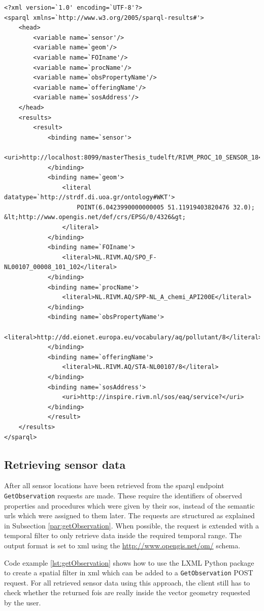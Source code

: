 \begin{lstlisting}[float,caption={Example SPARQL result of the query in Code example \ref{lst:getSensors}}, label={lst:getSensorsResponse}]
<?xml version=`1.0' encoding=`UTF-8'?>
<sparql xmlns=`http://www.w3.org/2005/sparql-results#'>
	<head>
		<variable name=`sensor'/>
		<variable name=`geom'/>
		<variable name=`FOIname'/>
		<variable name=`procName'/>
		<variable name=`obsPropertyName'/>
		<variable name=`offeringName'/>
		<variable name=`sosAddress'/>
	</head>
	<results>
		<result>
			<binding name=`sensor'>
				<uri>http://localhost:8099/masterThesis_tudelft/RIVM_PROC_10_SENSOR_18</uri>
			</binding>
			<binding name=`geom'>
				<literal datatype=`http://strdf.di.uoa.gr/ontology#WKT'>
					POINT(6.0423990000000005 51.11919403820476 32.0); &lt;http://www.opengis.net/def/crs/EPSG/0/4326&gt;
				</literal>
			</binding>
			<binding name=`FOIname'>
				<literal>NL.RIVM.AQ/SPO_F-NL00107_00008_101_102</literal>
			</binding>
			<binding name=`procName'>
				<literal>NL.RIVM.AQ/SPP-NL_A_chemi_API200E</literal>
			</binding>
			<binding name=`obsPropertyName'>
				<literal>http://dd.eionet.europa.eu/vocabulary/aq/pollutant/8</literal>
			</binding>
			<binding name=`offeringName'>
				<literal>NL.RIVM.AQ/STA-NL00107/8</literal>
			</binding>
			<binding name=`sosAddress'>
				<uri>http://inspire.rivm.nl/sos/eaq/service?</uri>
			</binding>
			</result>
	</results>
</sparql>
\end{lstlisting}


\subsection{Retrieving sensor data}
\begin{sloppypar}
After all sensor locations have been retrieved from the \ac{sparql} endpoint \texttt{GetObservation} requests are made. These require the identifiers of observed properties and procedures which were given by their \ac{sos}, instead of the semantic \acp{url} which were assigned to them later. The requests are structured as explained in Subsection \ref{par:getObservation}. When possible, the request is extended with a temporal filter to only retrieve data inside the required temporal range. The output format is set to \ac{xml} using the \url{http://www.opengis.net/om/} schema.
\end{sloppypar}

Code example \ref{lst:getObservation} shows how to use the LXML Python package to create a spatial filter in \ac{xml} which can be added to a \texttt{GetObservation} POST request. For all retrieved sensor data using this approach, the client still has to check whether the returned \acp{foi} are really inside the vector geometry requested by the user. 

